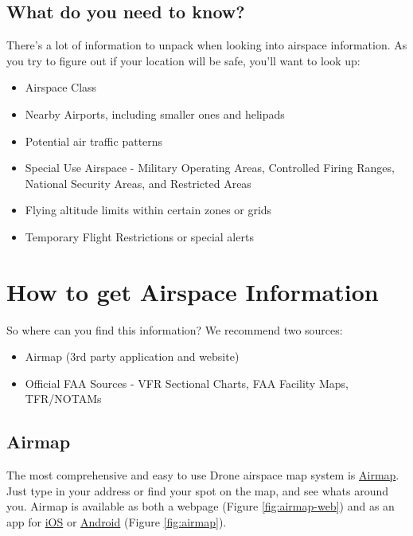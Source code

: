 \documentclass[
  12pt,
]{book}
\providecommand{\tightlist}{%
  \setlength{\itemsep}{0pt}\setlength{\parskip}{0pt}}
\begin{document}
\hypertarget{what-do-you-need-to-know}{%
\subsection{What do you need to know?}\label{what-do-you-need-to-know}}

There's a lot of information to unpack when looking into airspace information. As you try to figure out if your location will be safe, you'll want to look up:

\begin{itemize}
\tightlist
\item
  Airspace Class
\item
  Nearby Airports, including smaller ones and helipads
\item
  Potential air traffic patterns
\item
  Special Use Airspace - Military Operating Areas, Controlled Firing Ranges, National Security Areas, and Restricted Areas
\item
  Flying altitude limits within certain zones or grids
\item
  Temporary Flight Restrictions or special alerts
\end{itemize}

\hypertarget{how-to-get-airspace-information}{%
\section{How to get Airspace Information}\label{how-to-get-airspace-information}}

So where can you find this information? We recommend two sources:

\begin{itemize}
\tightlist
\item
  Airmap (3rd party application and website)
\item
  Official FAA Sources - VFR Sectional Charts, FAA Facility Maps, TFR/NOTAMs
\end{itemize}

\hypertarget{airmap}{%
\subsection{Airmap}\label{airmap}}

The most comprehensive and easy to use Drone airspace map system is \href{https://app.airmap.com/}{Airmap}. Just type in your address or find your spot on the map, and see whats around you. Airmap is available as both a webpage (Figure \ref{fig:airmap-web}) and as an app for \href{https://apps.apple.com/us/app/airmap-for-drones/id1042824733}{iOS} or \href{https://play.google.com/store/apps/details?id=com.airmap.airmap\&hl=en_US}{Android} (Figure \ref{fig:airmap}).
\end{document}
